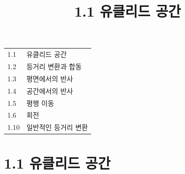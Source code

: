 \documentclass{article}
\title{1.1 유클리드 공간}
\date{}
\author{}
\begin{document}
\maketitle

\begin{tcolorbox}[colback=blue!5, colframe=blue!60!black,
  title=제 1 장\quad 유클리드 기하학 --- 한눈에 보기,
  boxrule=0.5mm, arc=3mm]
\begin{tabular}{@{}ll@{}}
1.1  & 유클리드 공간 \\
1.2  & 등거리 변환과 합동 \\
1.3  & 평면에서의 반사 \\
1.4  & 공간에서의 반사 \\
1.5  & 평행 이동 \\
1.6  & 회전 \\
1.10 & 일반적인 등거리 변환 \\
\end{tabular}
\end{tcolorbox}

\section*{1.1 유클리드 공간}
\end{document}
